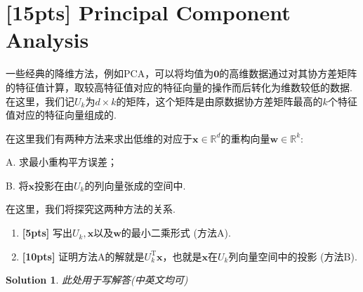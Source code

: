 \documentclass[a4paper,UTF8]{article}
\numberwithin{equation}{section}
\newtheorem*{mySol}{Solution}
\begin{document}
\section{[15pts] Principal Component Analysis}
一些经典的降维方法，例如PCA，可以将均值为$\mathbf{0}$的高维数据通过对其协方差矩阵的特征值计算，取较高特征值对应的特征向量的操作而后转化为维数较低的数据. 在这里，我们记$U_k$为$d\times k$的矩阵，这个矩阵是由原数据协方差矩阵最高的$k$个特征值对应的特征向量组成的. 

在这里我们有两种方法来求出低维的对应于$\mathbf{x}\in \mathbb{R}^d$的重构向量$\mathbf{w}\in \mathbb{R}^k$:

A. 求最小重构平方误差；

B. 将$\mathbf{x}$投影在由$U_k$的列向量张成的空间中.

在这里，我们将探究这两种方法的关系.
\begin{enumerate}[(1)]
\item \textbf{[5pts]} 写出$U_k, \mathbf{x}$以及$\mathbf{w}$的最小二乘形式 (方法A).
\item \textbf{[10pts]} 证明方法A的解就是$U_k^\mathrm{T}\mathbf{x}$，也就是$\mathbf{x}$在$U_k$列向量空间中的投影 (方法B).
\end{enumerate}
\begin{mySol}
	此处用于写解答(中英文均可)
	~\\
	~\\
	~\\
	~\\
	~\\
	~\\
	~\\
\end{mySol}
\end{document}
